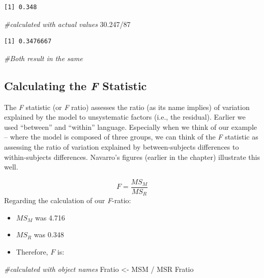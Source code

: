 \documentclass[
  11pt,
]{book}
\newenvironment{Shaded}{\begin{snugshade}}{\end{snugshade}}
\newcommand{\CommentTok}[1]{\textcolor[rgb]{0.56,0.35,0.01}{\textit{#1}}}
\newcommand{\DecValTok}[1]{\textcolor[rgb]{0.00,0.00,0.81}{#1}}
\newcommand{\FloatTok}[1]{\textcolor[rgb]{0.00,0.00,0.81}{#1}}
\newcommand{\NormalTok}[1]{#1}
\newcommand{\OtherTok}[1]{\textcolor[rgb]{0.56,0.35,0.01}{#1}}
\newcommand{\SpecialCharTok}[1]{\textcolor[rgb]{0.00,0.00,0.00}{#1}}
\providecommand{\tightlist}{%
  \setlength{\itemsep}{0pt}\setlength{\parskip}{0pt}}
\begin{document}
\begin{verbatim}
[1] 0.348
\end{verbatim}

\begin{Shaded}
\begin{Highlighting}[]
\CommentTok{\#calculated with actual values}
\FloatTok{30.247}\SpecialCharTok{/}\DecValTok{87}
\end{Highlighting}
\end{Shaded}

\begin{verbatim}
[1] 0.3476667
\end{verbatim}

\begin{Shaded}
\begin{Highlighting}[]
\CommentTok{\#Both result in the same}
\end{Highlighting}
\end{Shaded}

\hypertarget{calculating-the-f-statistic}{%
\subsection{\texorpdfstring{Calculating the \emph{F} Statistic}{Calculating the F Statistic}}\label{calculating-the-f-statistic}}

The \emph{F} statistic (or \emph{F} ratio) assesses the ratio (as its name implies) of variation explained by the model to unsystematic factors (i.e., the residual). Earlier we used ``between'' and ``within'' language. Especially when we think of our example -- where the model is composed of three groups, we can think of the \emph{F} statistic as assessing the ratio of variation explained by between-subjects differences to within-subjects differences. Navarro's \citeyearpar{navarro_chapter_2020} figures (earlier in the chapter) illustrate this well.

\[F = \frac{MS_{M}}{MS_{R}}\]
Regarding the calculation of our \emph{F}-ratio:

\begin{itemize}
\tightlist
\item
  \(MS_M\) was 4.716
\item
  \(MS_R\) was 0.348
\item
  Therefore, \(F\) is:
\end{itemize}

\begin{Shaded}
\begin{Highlighting}[]
\CommentTok{\#calculated with object names }
\NormalTok{Fratio }\OtherTok{\textless{}{-}}\NormalTok{ MSM }\SpecialCharTok{/}\NormalTok{ MSR}
\NormalTok{Fratio}
\end{Highlighting}
\end{Shaded}
\end{document}
